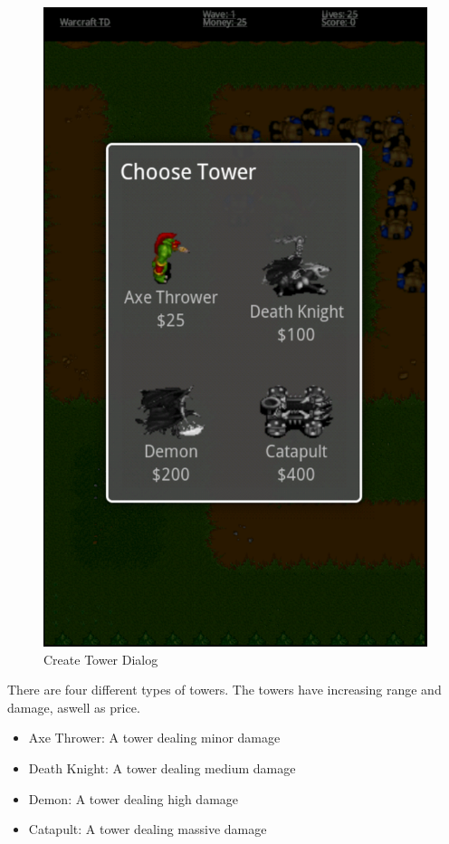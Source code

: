 \begin{figure} [h] 
	\center
		\includegraphics[scale=0.5]{main/figures/screenshots/create_tower}
		\caption{Create Tower Dialog}
		\label{usermanual:createTower}
\end{figure}

There are four different types of towers. The towers have increasing range and damage, aswell as price. 

\begin{itemize}
	\item Axe Thrower: A tower dealing minor damage
	\item Death Knight: A tower dealing medium damage
	\item Demon: A tower dealing high damage 
	\item Catapult: A tower dealing massive damage
\end{itemize}

